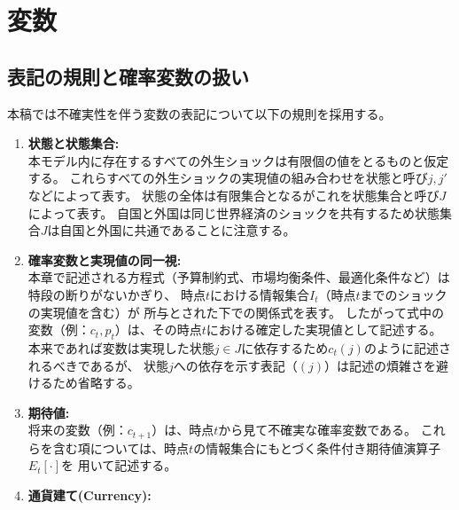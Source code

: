 
\section{変数}
\label{sec:chapter3_definitions_variables}

\subsection*{表記の規則と確率変数の扱い}
\label{sec:chapter3_definitions_variables_notation}
本稿では不確実性を伴う変数の表記について以下の規則を採用する。
\begin{enumerate}
    \item
    \label{itm:chapter3_definitions_variables_notation_state_space}
        \textbf{状態と状態集合:}\\
        本モデル内に存在するすべての外生ショックは有限個の値をとるものと仮定する。
        これらすべての外生ショックの実現値の組み合わせを状態と呼び\(j, j'\)などによって表す。
        状態の全体は有限集合となるがこれを状態集合と呼び\(J\)によって表す。
        自国と外国は同じ世界経済のショックを共有するため状態集合\(J\)は自国と外国に共通であることに注意する。
    \item
    \label{itm:chapter3_definitions_variables_notation_realization}
        \textbf{確率変数と実現値の同一視:}\\
        本章で記述される方程式（予算制約式、市場均衡条件、最適化条件など）は特段の断りがないかぎり、
        時点\(t\)における情報集合\(I_t\)（時点\(t\)までのショックの実現値を含む）が
        所与とされた下での関係式を表す。
        したがって式中の変数（例：\(c_t,p_t\)）は、その時点\(t\)における確定した実現値として記述する。
        本来であれば変数は実現した状態\(j\in J\)に依存するため\(c_t(j)\)のように記述されるべきであるが、
        状態\(j\)への依存を示す表記（\((j)\)）は記述の煩雑さを避けるため省略する。
    \item
    \label{itm:chapter3_definitions_variables_notation_expectation}
        \textbf{期待値:}\\
        将来の変数（例：\(c_{t+1}\)）は、時点\(t\)から見て不確実な確率変数である。
        これらを含む項については、時点\(t\)の情報集合にもとづく条件付き期待値演算子\(E_t[\cdot]\)を
        用いて記述する。
    \item
    \label{itm:chapter3_definitions_variables_notation_asterisk}
        \textbf{通貨建て(Currency):}\\

\end{enumerate}
